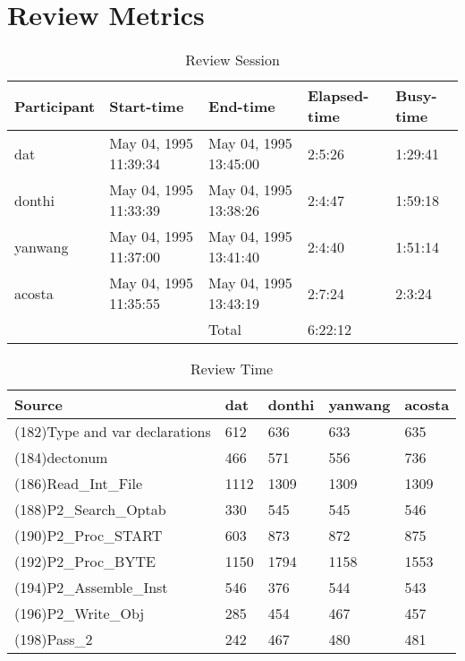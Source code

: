 \section{Review Metrics}
\begin{table}[hb]
\begin{center}
\begin{tabular}{|l|l|l|l|l|}
\hline
Participant & Start-time & End-time & Elapsed-time & Busy-time \\
\hline
dat & May 04, 1995 11:39:34 & May 04, 1995 13:45:00 & 2:5:26 & 1:29:41 \\
donthi & May 04, 1995 11:33:39 & May 04, 1995 13:38:26 & 2:4:47 & 1:59:18 \\
yanwang & May 04, 1995 11:37:00 & May 04, 1995 13:41:40 & 2:4:40 & 1:51:14 \\
acosta & May 04, 1995 11:35:55 & May 04, 1995 13:43:19 & 2:7:24 & 2:3:24 \\
\hline
 & & Total & 6:22:12 & \\
\hline
\end{tabular}
\end{center}
\caption{Review Session}
\end{table}


\begin{table}[hb]
\begin{center}
\begin{tabular}{|l|l|l|l|l|}
\hline
Source & dat & donthi & yanwang & acosta\\
\hline
(182)Type and var declarations & 612 & 636 & 633 & 635\\
(184)dectonum & 466 & 571 & 556 & 736\\
(186)Read\_Int\_File & 1112 & 1309 & 1309 & 1309\\
(188)P2\_Search\_Optab & 330 & 545 & 545 & 546\\
(190)P2\_Proc\_START & 603 & 873 & 872 & 875\\
(192)P2\_Proc\_BYTE & 1150 & 1794 & 1158 & 1553\\
(194)P2\_Assemble\_Inst & 546 & 376 & 544 & 543\\
(196)P2\_Write\_Obj & 285 & 454 & 467 & 457\\
(198)Pass\_2 & 242 & 467 & 480 & 481\\
\hline
\end{tabular}
\end{center}
\caption{Review Time}
\end{table}

